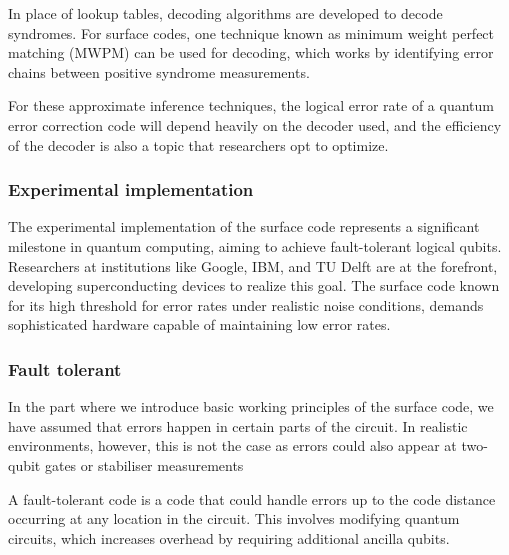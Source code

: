 \documentclass[final,5p,times,twocolumn,authoryear]{elsarticle}
\begin{document}
In place of lookup tables, decoding algorithms are developed to decode syndromes. For surface codes, one technique known as minimum weight perfect matching (MWPM) can be used for decoding, which works by identifying error chains between positive syndrome measurements.

For these approximate inference techniques, the logical error rate of a quantum error correction code will depend heavily on the decoder used, and the efficiency of the decoder is also a topic that researchers opt to optimize.

\subsubsection{Experimental implementation}
The experimental implementation of the surface code represents a significant milestone in quantum computing, aiming to achieve fault-tolerant logical qubits. Researchers at institutions like Google, IBM, and TU Delft are at the forefront, developing superconducting devices to realize this goal. The surface code known for its high threshold for error rates under realistic noise conditions, demands sophisticated hardware capable of maintaining low error rates.

\subsubsection{Fault tolerant}
In the part where we introduce basic working principles of the surface code, we have assumed that errors happen in certain parts of the circuit. In realistic environments, however, this is not the case as errors could also appear at two-qubit gates or stabiliser measurements

A fault-tolerant code is a code that could handle errors up to the code distance occurring at any location in the circuit. This involves modifying quantum circuits, which increases overhead by requiring additional ancilla qubits.









\end{document}

